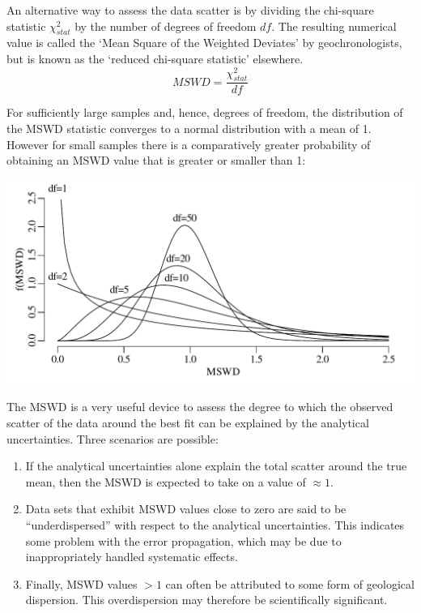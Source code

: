 \begin{refsection}
An alternative way to assess the data scatter is by dividing the
chi-square statistic $\chi^2_{stat}$ by the number of degrees of
freedom $df$.  The resulting numerical value is called the `Mean
Square of the Weighted Deviates' \citep[MSWD,][]{mcintyre1966} by
geochronologists, but is known as the `reduced chi-square statistic'
elsewhere.
\begin{equation}
  MSWD = \frac{\chi^2_{stat}}{df}
  \label{eq:mswd}
\end{equation}

For sufficiently large samples and, hence, degrees of
freedom, the distribution of the MSWD statistic converges to a normal
distribution with a mean of 1. However for small samples there is a
comparatively greater probability of obtaining an MSWD value that is
greater or smaller than 1:

\noindent\begin{minipage}[t]{.7\textwidth}
\strut\vspace*{-\baselineskip}\newline
\includegraphics[width=\textwidth]{../figures/mswd.pdf}
\end{minipage}
\begin{minipage}[t]{.3\textwidth}
  \label{fig:mswd}
\end{minipage}

The MSWD is a very useful device to assess the degree to which the
observed scatter of the data around the best fit can be explained by
the analytical uncertainties. Three scenarios are possible:

\begin{enumerate}
  \item If the analytical uncertainties alone explain the total
    scatter around the true mean, then the MSWD is expected to take on
    a value of $\approx{1}$.
\item Data sets that exhibit MSWD values close to zero are said to be
  ``underdispersed'' with respect to the analytical
  uncertainties. This indicates some problem with the error
  propagation, which may be due to inappropriately handled systematic
  effects.
\item Finally, MSWD values $>1$ can often be attributed to some form
  of geological dispersion. This overdispersion may therefore be
  scientifically significant.
\end{enumerate}


\end{refsection}

